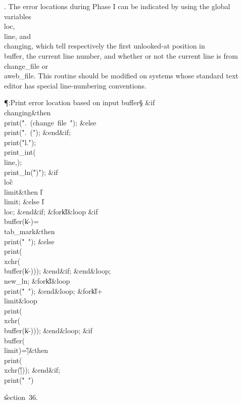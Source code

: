 . The error locations during Phase I can be indicated by using the global
variables \\{loc}, \\{line}, and \\{changing}, which tell respectively the
first
unlooked-at position in \\{buffer}, the current line number, and whether or not
the current line is from \\{change\_file} or \\{aweb\_file}.
This routine should be modified on systems whose standard text editor
has special line-numbering conventions.

\Y\P\?\4:Print error location based on input buffer\X\S\?\6
\&{if}\1\1\8\\{changing}\2\8\&{then}\6
\\{print}\?\1(\?\.{".\ (change\ file\ "}\?\2)\?;\6
\4\&{else}\6
\\{print}\?\1(\?\.{".\ ("}\?\2)\?;\2\6
\&{end}\8\2\&{if}\1;\6
\\{print}\?\1(\?\.{"l."}\?\2)\?;\5
\\{print\_int}\?\1(\?\\{line}\?,\?\2)\?;\5
\\{print\_ln}\?\1(\?\.{")"}\?\2)\?;\6
\&{if}\1\1\8\\{loc}\?\G\?\\{limit}\2\8\&{then}\6
\|l\?\K\?\\{limit};\6
\4\&{else}\6
\|l\?\K\?\\{loc};\2\6
\&{end}\8\2\&{if}\1;\6
\1\&{for}\8\|k\?\in{}\?\to\?\|l\8\&{loop}\6
\&{if}\1\1\8\\{buffer}\?\1(\?\|k\?-\?\2)=\?\\{tab\_mark}\2\8\&{then}\6
\\{print}\?\1(\?\.{"\ "}\?\2)\?;\6
\4\&{else}\6
\\{print}\?\1(\?\\{xchr}\?\1(\?\\{buffer}\?\1(\?\|k\?-\?\2)\2)\2)\?;\2\6
\&{end}\8\2\&{if}\1;\2\6
\&{end}\8\&{loop};\6
\\{new\_ln};\6
\1\&{for}\8\|k\?\in{}\?\to\?\|l\8\&{loop}\6
\\{print}\?\1(\?\.{"\ "}\?\2)\?;\2\6
\&{end}\8\&{loop};\6
\1\&{for}\8\|k\?\in\?\|l\?+\?\to\?\\{limit}\8\&{loop}\6
\\{print}\?\1(\?\\{xchr}\?\1(\?\\{buffer}\?\1(\?\|k\?-\?\2)\2)\2)\?;\2\6
\&{end}\8\&{loop};\6
\&{if}\1\1\8\\{buffer}\?\1(\?\\{limit}\?\2)=\?\H{|}\2\8\&{then}\6
\\{print}\?\1(\?\\{xchr}\?\1(\?\H{|}\?\2)\2)\?;\2\6
\&{end}\8\2\&{if}\1;\6
\\{print}\?\1(\?\.{"\ "}\?\2)\?\par
\U section~36.\fi

